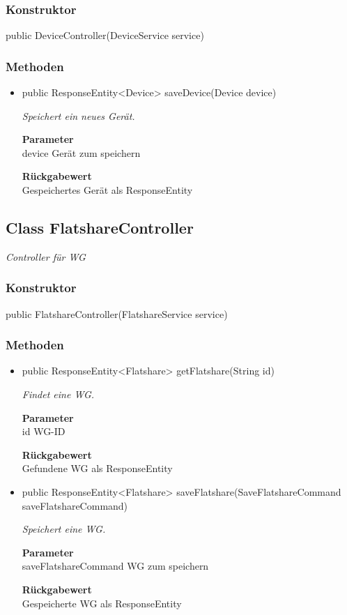 \documentclass[a4paper]{scrreprt}
\begin{document}
    \subsubsection{Konstruktor}
    public DeviceController(DeviceService service)
    \subsubsection{Methoden}
    \begin{itemize}
    	\item{public ResponseEntity<Device> saveDevice(Device device)}
    	
    	\textit{Speichert ein neues Gerät.}
    	
    	\textbf{Parameter} \\
    	device Gerät zum speichern
    	
    	\textbf{Rückgabewert} \\
    	Gespeichertes Gerät als ResponseEntity
    \end{itemize}
    \subsection{Class FlatshareController}
    \textit{Controller für WG}
    \subsubsection{Konstruktor}
    public FlatshareController(FlatshareService service)
    \subsubsection{Methoden}
    \begin{itemize}
    	\item{public ResponseEntity<Flatshare> getFlatshare(String id)}
    	
    	\textit{Findet eine WG.}
    	
    	\textbf{Parameter} \\
    	id WG-ID
    	
    	\textbf{Rückgabewert} \\
    	Gefundene WG als ResponseEntity        \item{public ResponseEntity<Flatshare> saveFlatshare(SaveFlatshareCommand saveFlatshareCommand)}
    	
    	\textit{Speichert eine WG.}
    	
    	\textbf{Parameter} \\
    	saveFlatshareCommand WG zum speichern
    	
    	\textbf{Rückgabewert} \\
    	Gespeicherte WG als ResponseEntity
    \end{itemize}
\end{document}
